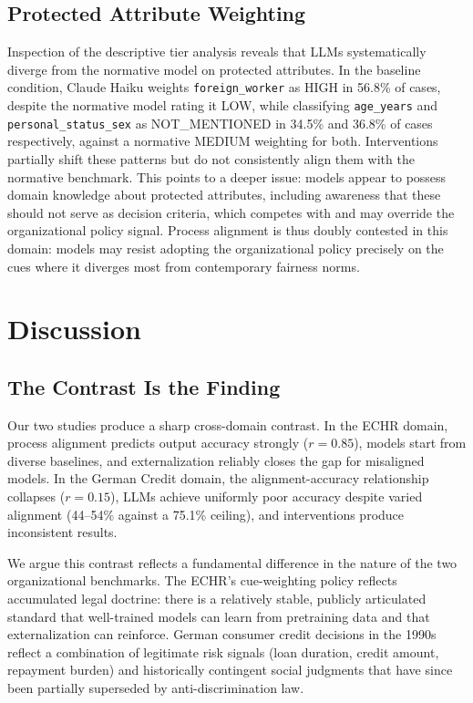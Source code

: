\documentclass{article}
\begin{document}
\subsection{Protected Attribute Weighting}

Inspection of the descriptive tier analysis reveals that LLMs systematically diverge from the normative model on protected attributes. In the baseline condition, Claude Haiku weights \texttt{foreign\_worker} as HIGH in 56.8\% of cases, despite the normative model rating it LOW, while classifying \texttt{age\_years} and \texttt{personal\_status\_sex} as NOT\_MENTIONED in 34.5\% and 36.8\% of cases respectively, against a normative MEDIUM weighting for both. Interventions partially shift these patterns but do not consistently align them with the normative benchmark. This points to a deeper issue: models appear to possess domain knowledge about protected attributes, including awareness that these should not serve as decision criteria, which competes with and may override the organizational policy signal. Process alignment is thus doubly contested in this domain: models may resist adopting the organizational policy precisely on the cues where it diverges most from contemporary fairness norms.


\section{Discussion}

\subsection{The Contrast Is the Finding}

Our two studies produce a sharp cross-domain contrast. In the ECHR domain, process alignment predicts output accuracy strongly ($r = 0.85$), models start from diverse baselines, and externalization reliably closes the gap for misaligned models. In the German Credit domain, the alignment-accuracy relationship collapses ($r = 0.15$), LLMs achieve uniformly poor accuracy despite varied alignment (44--54\% against a 75.1\% ceiling), and interventions produce inconsistent results.

We argue this contrast reflects a fundamental difference in the nature of the two organizational benchmarks. The ECHR's cue-weighting policy reflects accumulated legal doctrine: there is a relatively stable, publicly articulated standard that well-trained models can learn from pretraining data and that externalization can reinforce. German consumer credit decisions in the 1990s reflect a combination of legitimate risk signals (loan duration, credit amount, repayment burden) and historically contingent social judgments that have since been partially superseded by anti-discrimination law.
\end{document}
